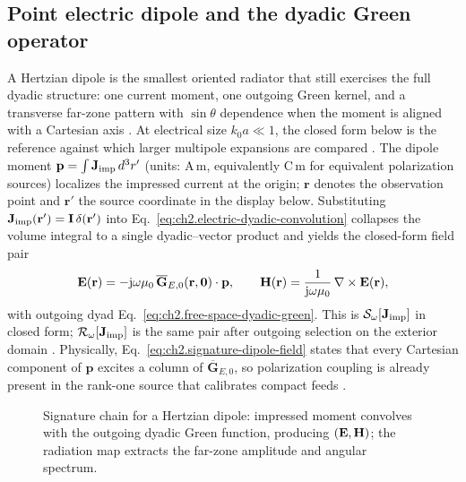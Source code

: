 \subsection{Point electric dipole and the dyadic Green operator}
\label{sec:ch23.signature-dipole}
A Hertzian dipole is the smallest oriented radiator that still exercises the full dyadic
structure: one current moment, one outgoing Green kernel, and a transverse far-zone pattern
with $\sin\theta$ dependence when the moment is aligned with a Cartesian axis
\cite{jackson1999,stratton1941}.
At electrical size $k_0 a\ll 1$, the closed form below is the reference against which larger
multipole expansions are compared \cite{chu1948,jackson1999}.
The dipole moment \(\mathbf{p}=\int \mathbf{J}_{\mathrm{imp}}\,d^{3}r'\) (units: A\,m, equivalently C\,m for
equivalent polarization sources) localizes the impressed current at the origin; $\mathbf{r}$
denotes the observation point and $\mathbf{r}'$ the source coordinate in the display below.
Substituting \(\mathbf{J}_{\mathrm{imp}}(\mathbf{r}')=\mathbf{I}\,\delta(\mathbf{r}')\) into
Eq.~\eqref{eq:ch2.electric-dyadic-convolution} collapses the volume integral to a single
dyadic--vector product and yields the closed-form field pair
\begin{equation}
\label{eq:ch2.signature-dipole-field}
\mathbf{E}(\mathbf{r})
=
-\mathrm{j}\omega\mu_0\,\overline{\mathbf{G}}_{E,0}(\mathbf{r},\mathbf{0})\cdot\mathbf{p},
\qquad
\mathbf{H}(\mathbf{r})=\frac{1}{\mathrm{j}\omega\mu_0}\,\nabla\times\mathbf{E}(\mathbf{r}),
\end{equation}
with outgoing dyad Eq.~\eqref{eq:ch2.free-space-dyadic-green}. This is
\(\mathcal{S}_\omega[\mathbf{J}_{\mathrm{imp}}]\) in closed form; \(\mathcal{R}_\omega[\mathbf{J}_{\mathrm{imp}}]\) is the
same pair after outgoing selection on the exterior domain
\cite{stratton1941}. Physically, Eq.~\eqref{eq:ch2.signature-dipole-field} states that
every Cartesian component of $\mathbf{p}$ excites a column of $\overline{\mathbf{G}}_{E,0}$,
so polarization coupling is already present in the rank-one source that calibrates compact
feeds \cite{stratton1941}.
\begin{figure}[t]
\centering
{}
\caption{Signature chain for a Hertzian dipole: impressed moment convolves with the
outgoing dyadic Green function, producing \((\mathbf{E},\mathbf{H})\); the radiation map extracts the
far-zone amplitude and angular spectrum.}
\label{fig:ch2.signature-hertzian-dipole}
\end{figure}
